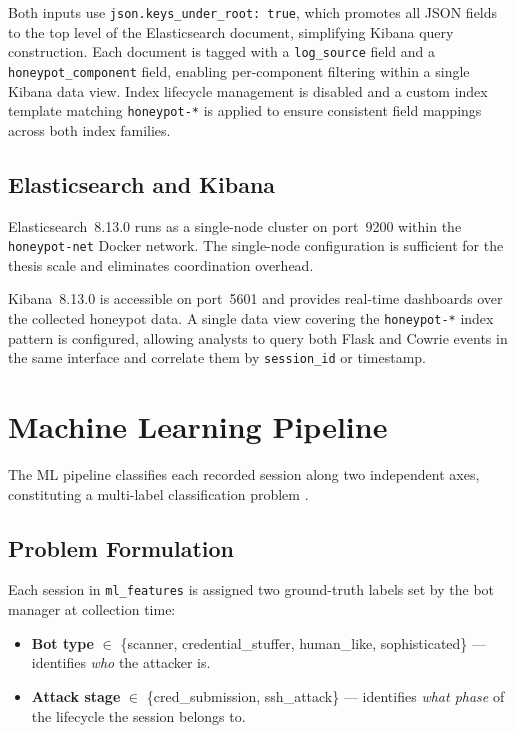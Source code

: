 Both inputs use \texttt{json.keys\_under\_root: true}, which promotes all JSON
fields to the top level of the Elasticsearch document, simplifying Kibana query
construction. Each document is tagged with a \texttt{log\_source} field and a
\texttt{honeypot\_component} field, enabling per-component filtering within a
single Kibana data view. Index lifecycle management is disabled and a custom
index template matching \texttt{honeypot-*} is applied to ensure consistent
field mappings across both index families.

\subsection{Elasticsearch and Kibana}

Elasticsearch~8.13.0 runs as a single-node cluster on port~9200 within the
\texttt{honeypot-net} Docker network. The single-node configuration is
sufficient for the thesis scale and eliminates coordination overhead.

Kibana~8.13.0 is accessible on port~5601 and provides real-time dashboards over
the collected honeypot data. A single data view covering the \texttt{honeypot-*}
index pattern is configured, allowing analysts to query both Flask and Cowrie
events in the same interface and correlate them by \texttt{session\_id} or
timestamp.

\section{Machine Learning Pipeline}
\label{sec:ml_design}

The ML pipeline classifies each recorded session along two independent axes,
constituting a multi-label classification problem \cite{Moric2025Honeypots}.

\subsection{Problem Formulation}

Each session in \texttt{ml\_features} is assigned two ground-truth labels set
by the bot manager at collection time:

\begin{itemize}
    \item \textbf{Bot type} $\in$ \{scanner, credential\_stuffer, human\_like,
    sophisticated\} — identifies \emph{who} the attacker is.
    \item \textbf{Attack stage} $\in$ \{cred\_submission, ssh\_attack\} —
    identifies \emph{what phase} of the lifecycle the session belongs to.
\end{itemize}

